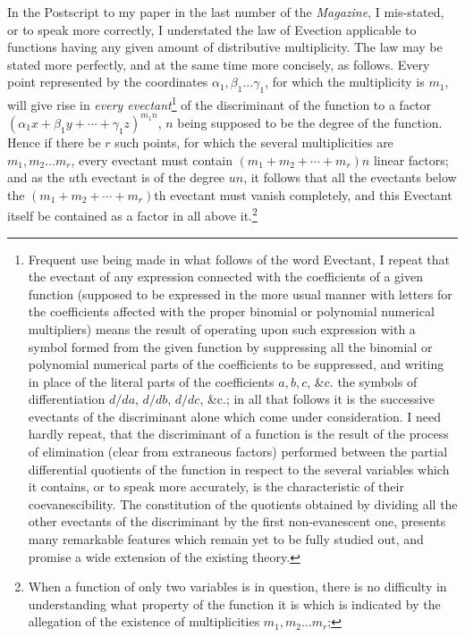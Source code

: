 \documentclass[11pt]{article}
\newcommand{\sourcepage}[1]{\marginpar{\scriptsize p.~#1}}
\begin{document}
\sourcepage{370}
In the Postscript to my paper in the last number of the \emph{Magazine}, I mis-stated, or to speak more correctly, I understated the law of Evection applicable to functions having any given amount of distributive multiplicity. The law may be stated more perfectly, and at the same time more concisely, as follows. Every point represented by the coordinates $\alpha_1,\beta_1\ldots\gamma_1$, for which the multiplicity is $m_1$, will give rise in \emph{every evectant}\footnote{Frequent use being made in what follows of the word Evectant, I repeat that the evectant of any expression connected with the coefficients of a given function (supposed to be expressed in the more usual manner with letters for the coefficients affected with the proper binomial or polynomial numerical multipliers) means the result of operating upon such expression with a symbol formed from the given function by suppressing all the binomial or polynomial numerical parts of the coefficients to be suppressed, and writing in place of the literal parts of the coefficients $a,b,c$, \&c. the symbols of differentiation $d/da$, $d/db$, $d/dc$, \&c.; in all that follows it is the successive evectants of the discriminant alone which come under consideration. I need hardly repeat, that the discriminant of a function is the result of the process of elimination (clear from extraneous factors) performed between the partial differential quotients of the function in respect to the several variables which it contains, or to speak more accurately, is the characteristic of their coevanescibility. The constitution of the quotients obtained by dividing all the other evectants of the discriminant by the first non-evanescent one, presents many remarkable features which remain yet to be fully studied out, and promise a wide extension of the existing theory.} of the discriminant of the function to a factor $(\alpha_1x+\beta_1y+\cdots+\gamma_1z)^{m_1n}$, $n$ being supposed to be the degree of the function. Hence if there be $r$ such points, for which the several multiplicities are $m_1,m_2\ldots m_r$, every evectant must contain $(m_1+m_2+\cdots+m_r)n$ linear factors; and as the $u$th evectant is of the degree $un$, it follows that all the evectants below the $(m_1+m_2+\cdots+m_r)$th evectant must vanish completely, and this Evectant itself be contained as a factor in all above it.\footnote{When a function of only two variables is in question, there is no difficulty in understanding what property of the function it is which is indicated by the allegation of the existence of multiplicities $m_1,m_2\ldots m_r$;}
\end{document}
